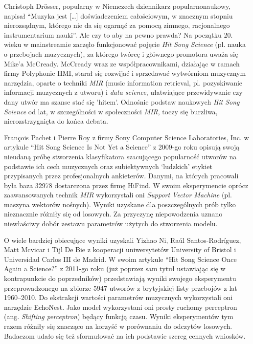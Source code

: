 \documentclass[a4paper,11pt]{article}
\begin{document}
    \bigskip

    Christoph Dr{ö}sser, popularny w Niemczech dziennikarz popularnonaukowy, napisał ``Muzyka jest [\ldots] doświadczeniem całościowym, w znacznym stopniu nierozsądnym, którego nie da się ogarnąć za pomocą zimnego, racjonalnego instrumentarium nauki''\cite{MuzykaDajSieUwiesc2021}. Ale czy to aby na pewno prawda? Na początku 20. wieku w mainstreamie zaczęło funkcjonować pojęcie \textit{Hit Song Science} (pl. nauka o przebojach muzycznych), za którego twórcę i głównego promotora uważa się Mike'a McCready\cite{HitSongScienceWiki}. McCready wraz ze współpracownikami, działając w ramach firmy Polyphonic HMI, starał się rozwijać i sprzedawać wytwórniom muzycznym narzędzia, oparte o techniki \textit{MIR} (music information retrieval, pl. pozyskiwanie informacji muzycznych z utworu) i \textit{data science}, ułatwiające przewidywanie czy dany utwór ma szanse stać się 'hitem'\cite{PolyphonicHMIWiki}. Odnośnie podstaw naukowych \textit{Hit Song Science} od lat, w szczególności w społeczności \textit{MIR}, toczy się burzliwa, nierozstrzygnięta do końca debata\cite{HitSongScienceWiki}.

    \bigskip

    François Pachet i Pierre Roy z firmy Sony Computer Science Laboratories, Inc. w artykule ``Hit Song Science Is Not Yet a Science'' z 2009-go roku\cite{HitSongScienceNotYet2009} opisują swoją nieudaną próbę stworzenia klasyfikatora szacującego popularność utworów na podstawie ich cech muzycznych oraz subiektywnych `ludzkich' etykiet przypisanych przez profesjonalnych ankieterów. Danymi, na których pracowali była baza 32978 dostarczona przez firmę HiFind. W swoim eksperymencie oprócz zaawansowanych technik \textit{MIR} wykorzystali oni \textit{Support Vector Machine} (pl. maszyna wektorów nośnych). Wyniki uzyskane dla poszczególnych prób tylko nieznacznie różniły się od losowych. Za przyczynę niepowodzenia uznano niewłaściwy dobór zestawu parametrów użytych do stworzenia modelu.

    \bigskip

    O wiele bardziej obiecujące wyniki uzyskali Yizhao Ni, Raúl Santos-Rodríguez, Matt Mcvicar i Tijl De Bie z kooperacji uniwersytetów University of Bristol i Universidad Carlos III de Madrid. W swoim artykule ``Hit Song Science Once Again a Science?'' z 2011-go roku\cite{HitSongScienceOnceAgain2011} (już poprzez sam tytuł ustawiając się w kontrapunkcie do poprzedników) przedstawiają wyniki swojego eksperymentu przeprowadzonego na zbiorze 5947 utworów z brytyjskiej listy przebojów z lat 1960--2010. Do ekstrakcji wartości parametrów muzycznych wykorzystali oni narzędzie EchoNest. Jako model wykorzystani oni prosty ruchomy perceptron (ang. \textit{Shifting perceptron}) będący funkcją czasu. Wyniki eksperymentów tym razem różniły się znacząco na korzyść w porównaniu do odczytów losowych. Badaczom udało się też sformułować na ich podstawie szereg cennych wniosków.
\end{document}
